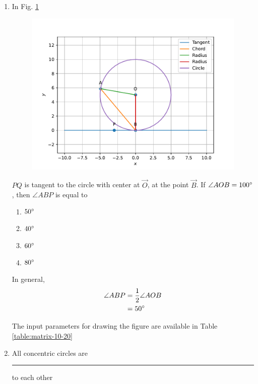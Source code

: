 \documentclass[journal,12pt,twocolumn]{IEEEtran}
\begin{document}
\begin{enumerate}
\item In Fig.
	  \ref{fig:matrix-10-20.pdf}
  \begin{figure}
	  \centering 
	  \includegraphics[width=\columnwidth]{figs/matrix-10-20.pdf}
	  \caption{}
	  \label{fig:matrix-10-20.pdf}
	  \end{figure}
	${PQ}$ is tangent to the circle with center at $\vec{O}$, at the point $\vec{B}$. If $\angle{AOB} = 100\degree$, then $\angle{ABP}$ is equal to
\begin{enumerate}
\item $50\degree$
\item $40\degree$
\item $60\degree$
\item $80\degree$
\end{enumerate}

 \solution  In general,
	\begin{align}
		\angle{ABP} &= \frac{1}{2} \angle{AOB} 
		\\
		&= 50 \degree
	\end{align}

	The input parameters for drawing the figure are available in 
Table	  \ref{table:matrix-10-20}
\begin{table}[ht!]
	
\caption{}
\label{table:matrix-10-20}	
\end{table}

\item All concentric circles are \rule{1.5cm}{0.15mm} to each other\\
\end{enumerate}
\end{document}
